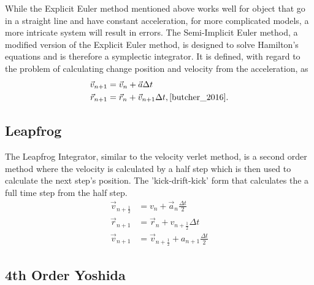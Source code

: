 While the Explicit Euler method mentioned above works well for object that go in a straight line and have constant acceleration, for more complicated models, a more intricate system will result in errors. The Semi-Implicit Euler method, a modified version of the Explicit Euler method, is designed to solve Hamilton's equations and is therefore a symplectic integrator. It is defined, with regard to the problem of calculating change position and velocity from the acceleration, as  
\begin{align*}
\vec{v}_{n+1}&=\vec{v}_n+\vec{a} \Delta t\\
\vec{r}_{n+1}&=\vec{r}_n+\vec{v}_{n+1} \Delta t, \cite{butcher_2016}.
\end{align*}

\subsection{Leapfrog}

The Leapfrog Integrator, similar to the velocity verlet method, is a second order method where the velocity is calculated by a half step which is then used to calculate the next step's position. The 'kick-drift-kick' form that calculates the a full time step from the half step.
\begin{align*}
\vec{v}_{n+\frac{1}{2}}&=v_n+\vec{a}_n \frac{\Delta t}{2}\\
\vec{r}_{n+1}&=\vec{r}_n+v_{n+\frac{1}{2}} \Delta t\\
\vec{v}_{n+1}&=\vec{v}_{n+\frac{1}{2}}+a_{n+1} \frac{\Delta t}{2}
\end{align*}

\subsection{4th Order Yoshida}

